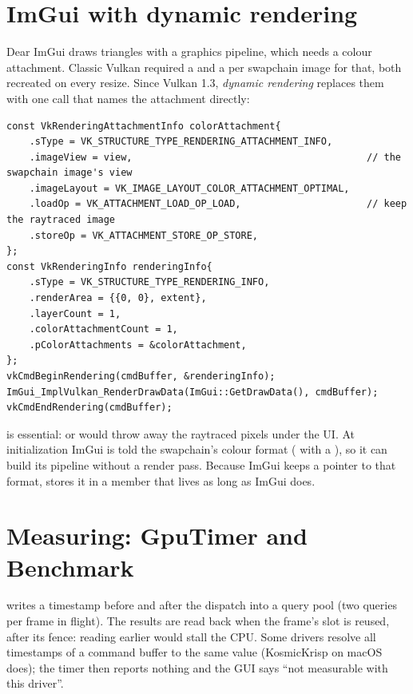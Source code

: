 \documentclass[11pt,a4paper]{article}
\begin{document}
\section{ImGui with dynamic rendering}

Dear ImGui draws triangles with a graphics pipeline, which needs a colour attachment. Classic Vulkan required a  and a  per swapchain image for that, both recreated on every resize. Since Vulkan 1.3, \emph{dynamic rendering} replaces them with one call that names the attachment directly:

\begin{lstlisting}
const VkRenderingAttachmentInfo colorAttachment{
    .sType = VK_STRUCTURE_TYPE_RENDERING_ATTACHMENT_INFO,
    .imageView = view,                                         // the swapchain image's view
    .imageLayout = VK_IMAGE_LAYOUT_COLOR_ATTACHMENT_OPTIMAL,
    .loadOp = VK_ATTACHMENT_LOAD_OP_LOAD,                      // keep the raytraced image
    .storeOp = VK_ATTACHMENT_STORE_OP_STORE,
};
const VkRenderingInfo renderingInfo{
    .sType = VK_STRUCTURE_TYPE_RENDERING_INFO,
    .renderArea = {{0, 0}, extent},
    .layerCount = 1,
    .colorAttachmentCount = 1,
    .pColorAttachments = &colorAttachment,
};
vkCmdBeginRendering(cmdBuffer, &renderingInfo);
ImGui_ImplVulkan_RenderDrawData(ImGui::GetDrawData(), cmdBuffer);
vkCmdEndRendering(cmdBuffer);
\end{lstlisting}

 is essential:  or  would throw away the raytraced pixels under the UI. At initialization ImGui is told the swapchain's colour format ( with a ), so it can build its pipeline without a render pass. Because ImGui keeps a pointer to that format,  stores it in a member that lives as long as ImGui does.

\section{Measuring: GpuTimer and Benchmark}

 writes a timestamp before and after the dispatch into a query pool (two queries per frame in flight). The results are read back when the frame's slot is reused, after its fence: reading earlier would stall the CPU. Some drivers resolve all timestamps of a command buffer to the same value (KosmicKrisp on macOS does); the timer then reports nothing and the GUI says ``not measurable with this driver''.
\end{document}

